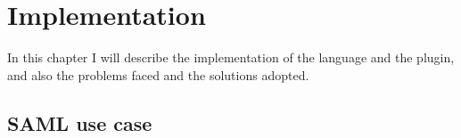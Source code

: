 \chapter{Implementation}
In this chapter I will describe the implementation of the language and the plugin, and also the problems faced and the solutions adopted.


\section{SAML use case}



